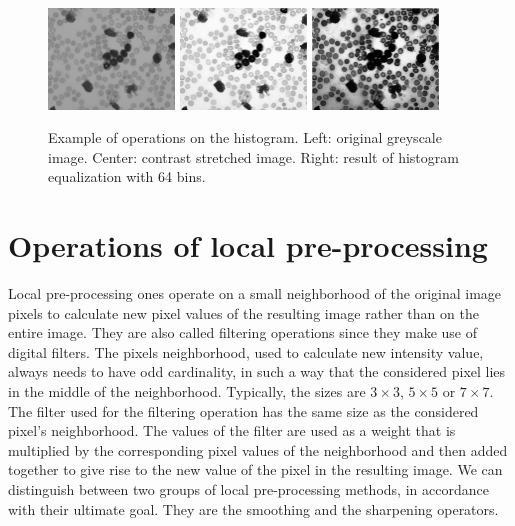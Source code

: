 \documentclass[final,a4paper,12pt,english]{UnicaPhdThesis3}
\begin{document}
\begin{figure}[!h]
	\centering
	\includegraphics[width=0.3\textwidth]{images/figContrastStretching1}
	\includegraphics[width=0.3\textwidth]{images/figContrastStretching2}
	\includegraphics[width=0.3\textwidth]{images/figHistogramEqualization}
	\caption{\label{fig:contrastStretching}Example of operations on the histogram. Left: original greyscale image. Center: contrast stretched image. Right: result of histogram equalization with 64 bins.}
\end{figure}

\section{Operations of local pre-processing} %
Local pre-processing ones operate on a small neighborhood of the original image pixels to calculate new pixel values ​​of the resulting image rather than on the entire image. They are also called filtering operations since they make use of digital filters. The pixels neighborhood, used to calculate new intensity value, always needs to have odd cardinality, in such a way that the considered pixel lies in the middle of the neighborhood. Typically, the sizes are $3\times3$, $5\times5$ or $7\times7$. The filter used for the filtering operation has the same size as the considered pixel's neighborhood. The values of the filter are used as a weight that is multiplied by the corresponding pixel values of the neighborhood and then added together to give rise to the new value of the pixel in the resulting image. We can distinguish between two groups of local pre-processing methods, in accordance with their ultimate goal. They are the smoothing and the sharpening operators.
\end{document}
